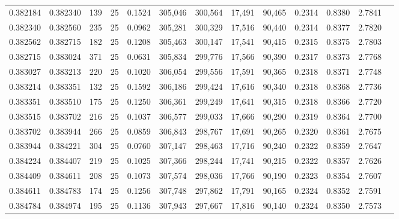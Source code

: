 \begin{tabular}{rrrrrrrrrrrrr}
0.382184 & 0.382340 &   139 &  25 &                                     0.1524 & 305,046 & 300,564 &  17,491 &  90,465 & 0.2314 & 0.8380 & 2.7841 \\
0.382340 & 0.382560 &   235 &  25 &                                     0.0962 & 305,281 & 300,329 &  17,516 &  90,440 & 0.2314 & 0.8377 & 2.7820 \\
0.382562 & 0.382715 &   182 &  25 &                                     0.1208 & 305,463 & 300,147 &  17,541 &  90,415 & 0.2315 & 0.8375 & 2.7803 \\
0.382715 & 0.383024 &   371 &  25 &                                     0.0631 & 305,834 & 299,776 &  17,566 &  90,390 & 0.2317 & 0.8373 & 2.7768 \\
0.383027 & 0.383213 &   220 &  25 &                                     0.1020 & 306,054 & 299,556 &  17,591 &  90,365 & 0.2318 & 0.8371 & 2.7748 \\
0.383214 & 0.383351 &   132 &  25 &                                     0.1592 & 306,186 & 299,424 &  17,616 &  90,340 & 0.2318 & 0.8368 & 2.7736 \\
0.383351 & 0.383510 &   175 &  25 &                                     0.1250 & 306,361 & 299,249 &  17,641 &  90,315 & 0.2318 & 0.8366 & 2.7720 \\
0.383515 & 0.383702 &   216 &  25 &                                     0.1037 & 306,577 & 299,033 &  17,666 &  90,290 & 0.2319 & 0.8364 & 2.7700 \\
0.383702 & 0.383944 &   266 &  25 &                                     0.0859 & 306,843 & 298,767 &  17,691 &  90,265 & 0.2320 & 0.8361 & 2.7675 \\
0.383944 & 0.384221 &   304 &  25 &                                     0.0760 & 307,147 & 298,463 &  17,716 &  90,240 & 0.2322 & 0.8359 & 2.7647 \\
0.384224 & 0.384407 &   219 &  25 &                                     0.1025 & 307,366 & 298,244 &  17,741 &  90,215 & 0.2322 & 0.8357 & 2.7626 \\
0.384409 & 0.384611 &   208 &  25 &                                     0.1073 & 307,574 & 298,036 &  17,766 &  90,190 & 0.2323 & 0.8354 & 2.7607 \\
0.384611 & 0.384783 &   174 &  25 &                                     0.1256 & 307,748 & 297,862 &  17,791 &  90,165 & 0.2324 & 0.8352 & 2.7591 \\
0.384784 & 0.384974 &   195 &  25 &                                     0.1136 & 307,943 & 297,667 &  17,816 &  90,140 & 0.2324 & 0.8350 & 2.7573 \\

\end{tabular}
